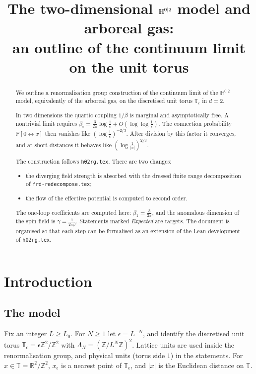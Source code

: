 \documentclass[11pt]{amsart}
\title[The continuum limit of the 2D $\bbH^{0|2}$ model]{The two-dimensional $\bbH^{0|2}$ model and arboreal gas:\\
an outline of the continuum limit on the unit torus}
\date{}
\theoremstyle{definition}
\theoremstyle{remark}
\numberwithin{equation}{section}
\newcommand{\bbH}{\mathbb{H}}
\newcommand{\Z}{\mathbb{Z}}
\newcommand{\R}{\mathbb{R}}
\newcommand{\Pb}{\mathbb{P}}
\newcommand{\T}{\mathbb{T}}
\newcommand{\conn}{\leftrightarrow}
\newcommand{\frd}{\texttt{frd-redecompose.tex}}
\newcommand{\hr}{\texttt{h02rg.tex}}
\begin{document}
\sloppy
\maketitle

\begin{abstract}
We outline a renormalisation group construction of the continuum limit of the $\bbH^{0|2}$
model, equivalently of the arboreal gas, on the discretised unit torus $\T_\epsilon$ in $d=2$.

In two dimensions the quartic coupling $1/\beta$ is marginal and asymptotically free. A
nontrivial limit requires
$\beta_\epsilon=\frac{3}{2\pi}\log\frac1\epsilon+O(\log\log\frac1\epsilon)$. The connection
probability $\Pb[0\conn x]$ then vanishes like $(\log\frac1\epsilon)^{-2/3}$. After division by
this factor it converges, and at short distances it behaves like $(\log\frac1{|x|})^{2/3}$.

The construction follows \hr{}. There are two changes:
\begin{itemize}
\item the diverging field strength is absorbed with the dressed finite range decomposition of
  \frd{};
\item the flow of the effective potential is computed to second order.
\end{itemize}
The one-loop coefficients are computed here: $\beta_1=\frac3{2\pi}$, and the anomalous dimension
of the spin field is $\gamma=\frac1{2\pi\beta}$. Statements marked \emph{Expected} are targets.
The document is organised so that each step can be formalised as an extension of the Lean
development of \hr{}.
\end{abstract}

\tableofcontents

\section{Introduction}
\label{sec:intro}

\subsection{The model}
Fix an integer $L\ge L_0$. For $N\ge1$ let $\epsilon=L^{-N}$, and identify the discretised unit
torus $\T_\epsilon=\epsilon\Z^2/\Z^2$ with $\Lambda_N=(\Z/L^N\Z)^2$. Lattice units are used
inside the renormalisation group, and physical units (torus side $1$) in the statements. For
$x\in\T=\R^2/\Z^2$, $x_\epsilon$ is a nearest point of $\T_\epsilon$, and $|x|$ is the Euclidean
distance on $\T$.
\end{document}
